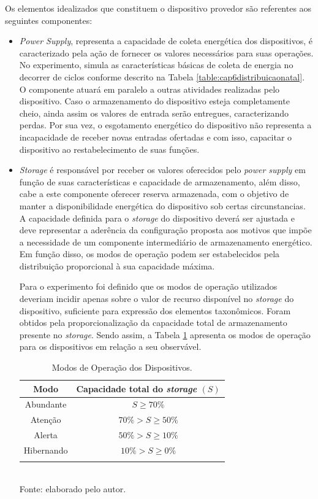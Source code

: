 Os elementos idealizados que constituem o dispositivo provedor são referentes aos seguintes componentes:
\begin{itemize}
	\item \textit{Power Supply}, representa a capacidade de coleta energética dos dispositivos, é caracterizado pela ação de fornecer os valores necessários para suas operações. No experimento, simula as características básicas de coleta de energia no decorrer de ciclos conforme descrito na Tabela \ref{table:cap6distribuicaonatal}. O componente atuará em paralelo a outras atividades realizadas pelo dispositivo. Caso o armazenamento do dispositivo esteja completamente cheio, ainda assim os valores de entrada serão entregues, caracterizando perdas. Por sua vez, o esgotamento energético do dispositivo não representa a incapacidade de receber novas entradas ofertadas e com isso, capacitar o dispositivo ao restabelecimento de suas funções.
	
	\item \textit{Storage} é responsável por receber os valores oferecidos pelo \textit{power supply} em função de suas características e capacidade de armazenamento, além disso, cabe a este componente oferecer reserva armazenada, com o objetivo de manter a disponibilidade energética do dispositivo sob certas circunstancias. A capacidade definida para o \textit{storage} do dispositivo deverá ser ajustada e deve representar a aderência da configuração proposta aos motivos que impõe a necessidade de um componente intermediário de armazenamento energético. Em função disso, os modos de operação podem ser estabelecidos pela distribuição proporcional à sua capacidade máxima.
	
	Para o experimento foi definido que os modos de operação utilizados deveriam incidir  apenas sobre o valor de recurso disponível no \textit{storage} do dispositivo, suficiente para expressão dos elementos taxonômicos. Foram obtidos pela proporcionalização da capacidade total de armazenamento presente no \textit{storage}. Sendo assim, a Tabela \ref{table:cap6:modos} apresenta os modos de operação para os dispositivos em relação a seu observável.
	
	
	\begingroup
	\begin{table}[htbp]
		
		\centering
		\caption{Modos de Operação dos Dispositivos.}
		\small
		\begin{tabular}{ |c | c |}
			\hline
			Modo &Capacidade total do \textit{storage} $ (S) $\\
			\hline
			Abundante & $S \ge 70\% $\\\hline
			Atenção & $70\% > S \ge 50\% $\\\hline
			Alerta & $ 50\% > S \ge 10\%$ \\\hline
			Hibernando & $10\% > S \ge 0\%$  \\ \hline\addlinespace[1pt]
		\end{tabular}
		\label{table:cap6:modos}
		\\
		\footnotesize Fonte: elaborado pelo autor.
		

\end{table}
\end{itemize}
